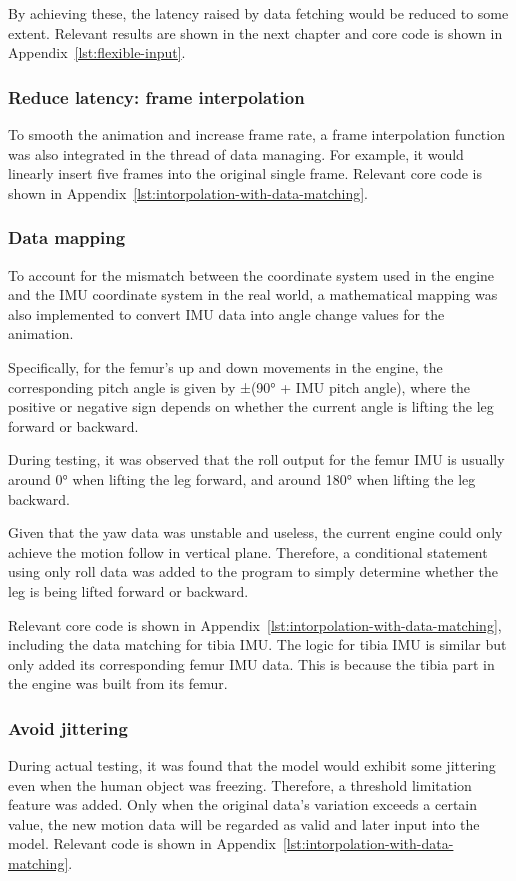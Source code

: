 By achieving these, the latency raised by data fetching would be reduced to some extent.
Relevant results are shown in the next chapter and core code is shown in
Appendix~\ref{lst:flexible-input}.


\subsubsection{Reduce latency: frame interpolation}
To smooth the animation and increase frame rate, a frame interpolation function was also integrated in the thread of data managing.
For example, it would linearly insert five frames into the original single frame.
Relevant core code is shown in Appendix~\ref{lst:intorpolation-with-data-matching}.


\subsubsection{Data mapping}
To account for the mismatch between the coordinate system used in the engine and the IMU coordinate system in the real world, a mathematical mapping was also implemented to convert IMU data into angle change values for the animation.

Specifically, for the femur's up and down movements in the engine, the corresponding pitch angle is given by ±(90° + IMU pitch angle), where the positive or negative sign depends on whether the current angle is lifting the leg forward or backward.

During testing, it was observed that the roll output for the femur IMU is usually around 0° when lifting the leg forward, and around 180° when lifting the leg backward.

Given that the yaw data was unstable and useless, the current engine could only achieve the motion follow in vertical plane.
Therefore, a conditional statement using only roll data was added to the program to simply determine whether the leg is being lifted forward or backward.

Relevant core code is shown in Appendix~\ref{lst:intorpolation-with-data-matching}, including the data matching for tibia IMU\@.
The logic for tibia IMU is similar but only added its corresponding femur IMU data.
This is because the tibia part in the engine was built from its femur.

\subsubsection{Avoid jittering}
During actual testing, it was found that the model would exhibit some jittering even when the human object was freezing.
Therefore, a threshold limitation feature was added.
Only when the original data's variation exceeds a certain value, the new motion data will be regarded as valid and later input into the model.
Relevant code is shown in Appendix~\ref{lst:intorpolation-with-data-matching}.



